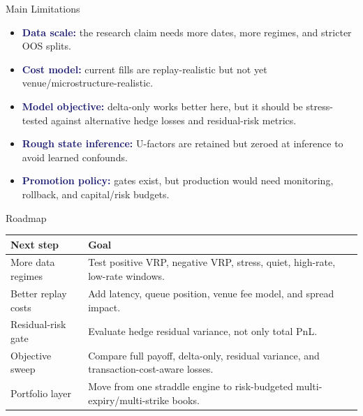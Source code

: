 \documentclass[11pt,aspectratio=169]{beamer}
\newcommand{\1}{\mathbf{1}}
\newcommand{\claim}[1]{\textcolor{midnightblue}{\textbf{#1}}}
\begin{document}
\begin{frame}{Main Limitations}
    \small
    \begin{itemize}
        \item \claim{Data scale:} the research claim needs more dates, more regimes, and stricter OOS splits.
        \item \claim{Cost model:} current fills are replay-realistic but not yet venue/microstructure-realistic.
        \item \claim{Model objective:} delta-only works better here, but it should be stress-tested against alternative hedge losses and residual-risk metrics.
        \item \claim{Rough state inference:} U-factors are retained but zeroed at inference to avoid learned confounds.
        \item \claim{Promotion policy:} gates exist, but production would need monitoring, rollback, and capital/risk budgets.
    \end{itemize}
\end{frame}

\begin{frame}{Roadmap}
    \small
    \begin{center}
    \renewcommand{\arraystretch}{1.18}
    \begin{tabular}{p{}p{}}
    \toprule
    \textbf{Next step} & \textbf{Goal} \\
    \midrule
    More data regimes & Test positive VRP, negative VRP, stress, quiet, high-rate, low-rate windows. \\
    Better replay costs & Add latency, queue position, venue fee model, and spread impact. \\
    Residual-risk gate & Evaluate hedge residual variance, not only total PnL. \\
    Objective sweep & Compare full payoff, delta-only, residual variance, and transaction-cost-aware losses. \\
    Portfolio layer & Move from one straddle engine to risk-budgeted multi-expiry/multi-strike books. \\
    \bottomrule
    \end{tabular}
    \end{center}
\end{frame}
\end{document}
